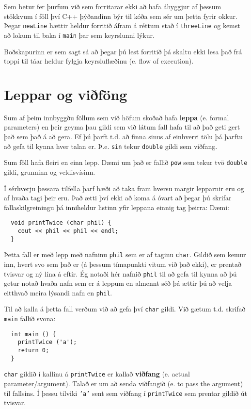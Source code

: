 Sem betur fer þurfum við sem forritarar ekki að hafa áhyggjur af þessum stökkvum í föll því C++ þýðandinn býr til kóða sem sér um þetta fyrir okkur.
Þegar {\tt newLine} hættir heldur forritið áfram á réttum stað í {\tt threeLine} og kemst að lokum til baka í {\tt main} þar sem keyrslunni lýkur.

Boðskapurinn er sem sagt sá að þegar þú lest forritið þá skaltu ekki lesa það frá toppi til táar heldur fylgja keyrsluflæðinu (e. flow of execution).

\section {Leppar og viðföng}

Sum af þeim innbyggðu föllum sem við höfum skoðað hafa {\bf leppa} (e. formal parameters)
en þeir geyma þau gildi sem við látum fall hafa til að það geti gert það sem það á að gera.
Ef þú þarft t.d. að finna sinus af einhverri tölu þá þarftu að gefa til kynna hver talan er.
Þ.e. {\tt sin} tekur {\tt double} gildi sem viðfang.

Sum föll hafa fleiri en einn lepp.
Dæmi um það er fallið {\tt pow} sem tekur tvö {\tt double} gildi, grunninn og veldisvísinn.

Í sérhverju þessara tilfella þarf bæði að taka fram hversu margir lepparnir eru og af hvaða tagi þeir eru.
Það ætti því ekki að koma á óvart að þegar þú skrifar fallaskilgreiningu þá inniheldur listinn yfir leppana einnig tag þeirra:
Dæmi:

\begin{verbatim}
  void printTwice (char phil) {
    cout << phil << phil << endl;
  }
\end{verbatim}
%
Þetta fall er með lepp með nafninu {\tt phil} sem er af taginu {\tt char}.
Gildið sem kemur inn, hvert svo sem það er (á þessum tímapunkti vitum við það ekki), er prentað tvisvar og ný lína á eftir.
Ég notaði hér nafnið {\tt phil} til að gefa til kynna að þú getur notað hvaða nafn sem er á leppum en almennt séð þá ættir þú að velja eitthvað meira lýsandi nafn en {\tt phil}.

Til að kalla á þetta fall verðum við að gefa því {\tt char} gildi.
Við gætum t.d. skrifað {\tt main} fallið svona:

\begin{verbatim}
  int main () {
    printTwice ('a');
    return 0;
  }
\end{verbatim}
%
{\tt char} gildið í kallinu á {\tt printTwice} er kallað {\bf viðfang} (e. actual parameter/argument).
Talað er um að senda viðfangið (e. to pass the argument) til fallsins.
Í þessu tilviki {\tt 'a'} sent sem viðfang í {\tt printTwice} sem prentar gildið út tvisvar.

